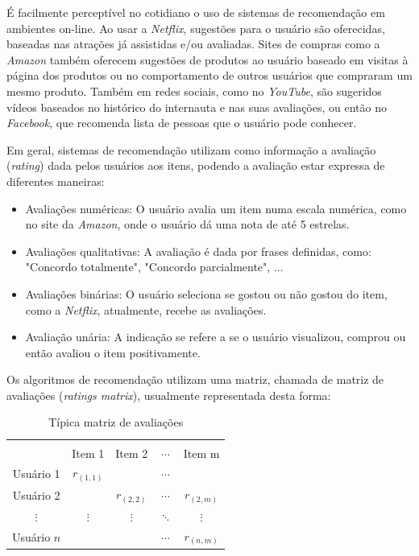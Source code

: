 \documentclass[12pt,a4paper,header]{abnt}
\begin{document}
É facilmente perceptível no cotidiano o uso de sistemas de recomendação em ambientes on-line. Ao usar a \textit{Netflix}, sugestões para o usuário são oferecidas, baseadas nas atrações já assistidas e/ou avaliadas. Sites de compras como a \textit{Amazon} também oferecem sugestões de produtos ao usuário baseado em visitas à página dos produtos ou no comportamento de outros usuários que compraram um mesmo produto. Também em redes sociais, como no \textit{YouTube}, são sugeridos vídeos baseados no histórico do internauta e nas suas avaliações, ou então no \textit{Facebook}, que recomenda lista de pessoas que o usuário pode conhecer\cite{gorakala2015building}.

Em geral, sistemas de recomendação utilizam como informação a avaliação (\textit{rating}) dada pelos usuários aos itens, podendo a avaliação estar expressa de diferentes maneiras\cite{shapira2011recommender}:

\begin{itemize}

\item Avaliações numéricas: O usuário avalia um item numa escala numérica, como no site da \textit{Amazon}, onde o usuário dá uma nota de até 5 estrelas.

\item Avaliações qualitativas: A avaliação é dada por frases definidas, como: "Concordo totalmente", "Concordo parcialmente", ...

\item Avaliações binárias: O usuário seleciona se gostou ou não gostou do item, como a \textit{Netflix}, atualmente, recebe as avaliações.

\item Avaliação unária: A indicação se refere a se o usuário visualizou, comprou ou então avaliou o item positivamente.

\end{itemize}

Os algoritmos de recomendação utilizam uma matriz, chamada de matriz de avaliações (\textit{ratings matrix}), usualmente representada desta forma:

\begin{table}[!h]
\centering
\caption{Típica matriz de avaliações}
\label{rating_matrix}
\begin{tabular}{c|c|c|c|c}
\hline \\
            & Item 1      & Item 2      & $\cdots$ & Item m      \\
Usuário 1   & $r_{(1, 1)}$ &             & $\cdots$  &             \\
Usuário 2   &  & $r_{(2, 2)}$ & $\cdots$ & $r_{(2, m)}$ \\
$\vdots$       &    $\vdots$  & $\vdots$       &  $\ddots$ & $\vdots$ \\
Usuário $n$ &  &             & $\cdots$ & $r_{(n, m)}$ \\
\hline
\end{tabular}
\end{table}
\end{document}
